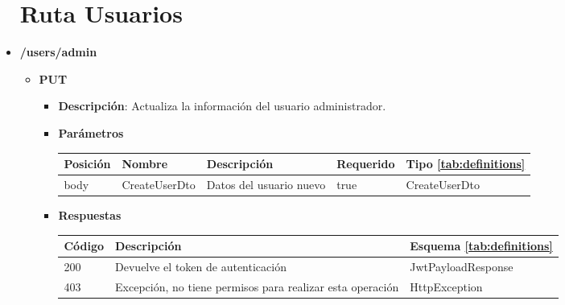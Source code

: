 \begin{itemize}
\section{Ruta Usuarios}
\item \textbf{/users/admin}
            
    \begin{itemize} 
        \item \textbf{PUT}
            \begin{itemize} 
                \item \textbf{Descripción}: Actualiza la información del usuario administrador.
                \item \textbf{Parámetros}
                    
                    \begin{table}[h]
                        \centering
                        \begin{tabular}{ l l l l l } 
                            \toprule
                            Posición & Nombre & Descripción & Requerido & Tipo \ref{tab:definitions} \\ 
                            \midrule
                            body & CreateUserDto & Datos del usuario nuevo & true & CreateUserDto \\  
                            \bottomrule
                        \end{tabular} 
                    \end{table}
                    
                \item \textbf{Respuestas}
                    
                    \begin{table}[h]
                        \centering
                        \begin{tabular}{ l p{6cm} l } 
                            \toprule
                            Código & Descripción & Esquema \ref{tab:definitions} \\ 
                            \midrule 
                            200 & Devuelve el token de autenticación & JwtPayloadResponse \\ 
                            403 & Excepción, no tiene permisos para realizar esta operación & HttpException \\  
                            \bottomrule
                        \end{tabular} 
                    \end{table}
            \end{itemize} 
    \end{itemize}
\newpage

\end{itemize}
